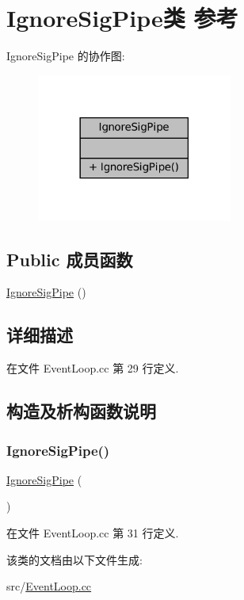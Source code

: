 \hypertarget{classIgnoreSigPipe}{}\section{Ignore\+Sig\+Pipe类 参考}
\label{classIgnoreSigPipe}


Ignore\+Sig\+Pipe 的协作图\+:\nopagebreak
\begin{figure}[H]
\begin{center}
\leavevmode
\includegraphics[width=182pt]{classIgnoreSigPipe__coll__graph}
\end{center}
\end{figure}
\subsection*{Public 成员函数}
\begin{DoxyCompactItemize}
\item 
\hyperlink{classIgnoreSigPipe_a08f53acf80ebe991140542bdd1fe5190}{Ignore\+Sig\+Pipe} ()
\end{DoxyCompactItemize}


\subsection{详细描述}


在文件 Event\+Loop.\+cc 第 29 行定义.



\subsection{构造及析构函数说明}
\mbox{\label{classIgnoreSigPipe_a08f53acf80ebe991140542bdd1fe5190}} 
\subsubsection{\texorpdfstring{Ignore\+Sig\+Pipe()}{IgnoreSigPipe()}}
{\footnotesize\ttfamily \hyperlink{classIgnoreSigPipe}{Ignore\+Sig\+Pipe} (\begin{DoxyParamCaption}{ }\end{DoxyParamCaption})\hspace{0.3cm}{\ttfamily [inline]}}



在文件 Event\+Loop.\+cc 第 31 行定义.



该类的文档由以下文件生成\+:\begin{DoxyCompactItemize}
\item 
src/\hyperlink{EventLoop_8cc}{Event\+Loop.\+cc}\end{DoxyCompactItemize}
